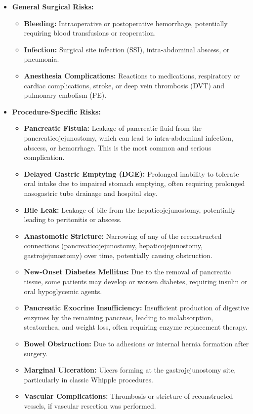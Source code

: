 \begin{itemize}
  \item \textbf{General Surgical Risks:}
    \begin{itemize}
      \item \textbf{Bleeding:} Intraoperative or postoperative hemorrhage, potentially requiring blood transfusions or reoperation.
      \item \textbf{Infection:} Surgical site infection (SSI), intra-abdominal abscess, or pneumonia.
      \item \textbf{Anesthesia Complications:} Reactions to medications, respiratory or cardiac complications, stroke, or deep vein thrombosis (DVT) and pulmonary embolism (PE).
    \end{itemize}
  \item \textbf{Procedure-Specific Risks:}
    \begin{itemize}
      \item \textbf{Pancreatic Fistula:} Leakage of pancreatic fluid from the pancreaticojejunostomy, which can lead to intra-abdominal infection, abscess, or hemorrhage. This is the most common and serious complication.
      \item \textbf{Delayed Gastric Emptying (DGE):} Prolonged inability to tolerate oral intake due to impaired stomach emptying, often requiring prolonged nasogastric tube drainage and hospital stay.
      \item \textbf{Bile Leak:} Leakage of bile from the hepaticojejunostomy, potentially leading to peritonitis or abscess.
      \item \textbf{Anastomotic Stricture:} Narrowing of any of the reconstructed connections (pancreaticojejunostomy, hepaticojejunostomy, gastrojejunostomy) over time, potentially causing obstruction.
      \item \textbf{New-Onset Diabetes Mellitus:} Due to the removal of pancreatic tissue, some patients may develop or worsen diabetes, requiring insulin or oral hypoglycemic agents.
      \item \textbf{Pancreatic Exocrine Insufficiency:} Insufficient production of digestive enzymes by the remaining pancreas, leading to malabsorption, steatorrhea, and weight loss, often requiring enzyme replacement therapy.
      \item \textbf{Bowel Obstruction:} Due to adhesions or internal hernia formation after surgery.
      \item \textbf{Marginal Ulceration:} Ulcers forming at the gastrojejunostomy site, particularly in classic Whipple procedures.
      \item \textbf{Vascular Complications:} Thrombosis or stricture of reconstructed vessels, if vascular resection was performed.
    \end{itemize}
\end{itemize}

